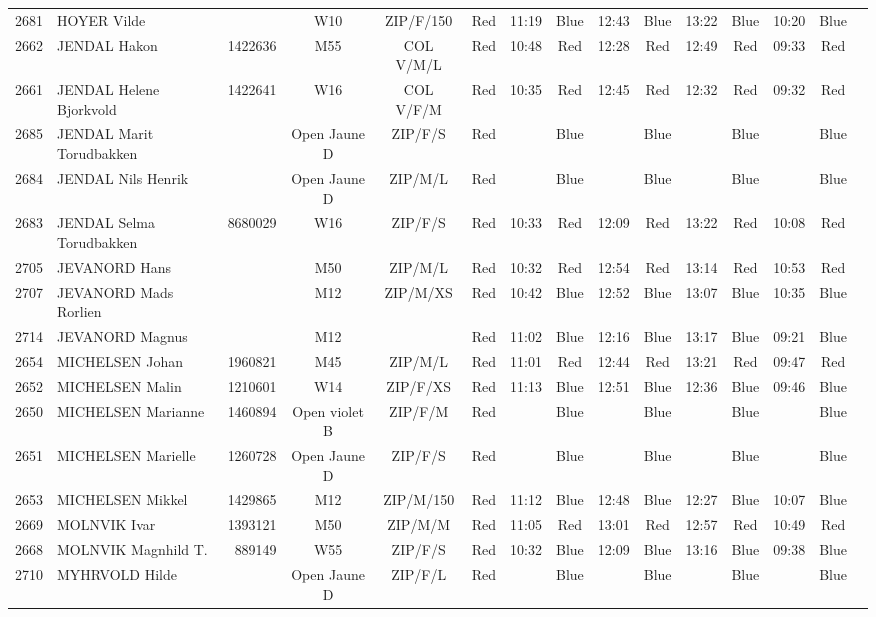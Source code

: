 \documentclass{report}
\begin{document}
\begin{longtable}{|c|l|r|c|c|*{5}{cc|}}
    2681 & HOYER Vilde &  & W10 & ZIP/F/150 & Red & 11:19 & Blue & 12:43 & Blue & 13:22 & Blue & 10:20 & Blue &  \\
    2662 & JENDAL Hakon & 1422636 & M55 & COL V/M/L & Red & 10:48 & Red & 12:28 & Red & 12:49 & Red & 09:33 & Red &  \\
    2661 & JENDAL Helene Bjorkvold & 1422641 & W16 & COL V/F/M & Red & 10:35 & Red & 12:45 & Red & 12:32 & Red & 09:32 & Red &  \\
    2685 & JENDAL Marit Torudbakken &  & Open Jaune D & ZIP/F/S & Red &   & Blue &   & Blue &   & Blue &   & Blue &  \\
    2684 & JENDAL Nils Henrik &  & Open Jaune D & ZIP/M/L & Red &   & Blue &   & Blue &   & Blue &   & Blue &  \\
    2683 & JENDAL Selma Torudbakken & 8680029 & W16 & ZIP/F/S & Red & 10:33 & Red & 12:09 & Red & 13:22 & Red & 10:08 & Red &  \\
    2705 & JEVANORD Hans &  & M50 & ZIP/M/L & Red & 10:32 & Red & 12:54 & Red & 13:14 & Red & 10:53 & Red &  \\
    2707 & JEVANORD Mads Rorlien &  & M12 & ZIP/M/XS & Red & 10:42 & Blue & 12:52 & Blue & 13:07 & Blue & 10:35 & Blue &  \\
    2714 & JEVANORD Magnus &  & M12 &   & Red & 11:02 & Blue & 12:16 & Blue & 13:17 & Blue & 09:21 & Blue &  \\
    2654 & MICHELSEN Johan & 1960821 & M45 & ZIP/M/L & Red & 11:01 & Red & 12:44 & Red & 13:21 & Red & 09:47 & Red &  \\
    2652 & MICHELSEN Malin & 1210601 & W14 & ZIP/F/XS & Red & 11:13 & Blue & 12:51 & Blue & 12:36 & Blue & 09:46 & Blue &  \\
    2650 & MICHELSEN Marianne & 1460894 & Open violet B & ZIP/F/M & Red &   & Blue &   & Blue &   & Blue &   & Blue &  \\
    2651 & MICHELSEN Marielle & 1260728 & Open Jaune D & ZIP/F/S & Red &   & Blue &   & Blue &   & Blue &   & Blue &  \\
    2653 & MICHELSEN Mikkel & 1429865 & M12 & ZIP/M/150 & Red & 11:12 & Blue & 12:48 & Blue & 12:27 & Blue & 10:07 & Blue &  \\
    2669 & MOLNVIK Ivar & 1393121 & M50 & ZIP/M/M & Red & 11:05 & Red & 13:01 & Red & 12:57 & Red & 10:49 & Red &  \\
    2668 & MOLNVIK Magnhild T. & 889149 & W55 & ZIP/F/S & Red & 10:32 & Blue & 12:09 & Blue & 13:16 & Blue & 09:38 & Blue &  \\
    2710 & MYHRVOLD Hilde &  & Open Jaune D & ZIP/F/L & Red &   & Blue &   & Blue &   & Blue &   & Blue &  \\

\end{longtable}
\end{document}
